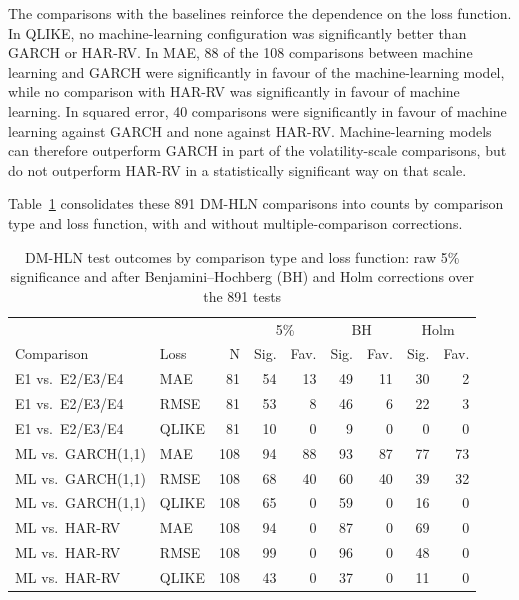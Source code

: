 \documentclass[a4paper,fleqn]{cas-sc}
\begin{document}
The comparisons with the baselines reinforce the dependence on the loss function. In QLIKE, no machine-learning configuration was significantly better than GARCH or HAR-RV. In MAE, 88 of the 108 comparisons between machine learning and GARCH were significantly in favour of the machine-learning model, while no comparison with HAR-RV was significantly in favour of machine learning. In squared error, 40 comparisons were significantly in favour of machine learning against GARCH and none against HAR-RV. Machine-learning models can therefore outperform GARCH in part of the volatility-scale comparisons, but do not outperform HAR-RV in a statistically significant way on that scale.

Table~\ref{tab:dm_tests} consolidates these 891 DM-HLN comparisons into counts by comparison type and loss function, with and without multiple-comparison corrections.

\begin{table}[t]
\centering
\caption{DM-HLN test outcomes by comparison type and loss function: raw 5\% significance and after Benjamini--Hochberg (BH) and Holm corrections over the 891 tests}
\label{tab:dm_tests}
\scriptsize
\setlength{\tabcolsep}{2pt}
\begin{tabular}{@{}p{2.2cm}p{0.8cm}rrrrrrr@{}}
\hline
 & & & \multicolumn{2}{c}{5\%} & \multicolumn{2}{c}{BH} & \multicolumn{2}{c}{Holm} \\
Comparison & Loss & N & Sig. & Fav. & Sig. & Fav. & Sig. & Fav. \\
\hline
E1 vs.\ E2/E3/E4 & MAE & 81 & 54 & 13 & 49 & 11 & 30 & 2 \\
E1 vs.\ E2/E3/E4 & RMSE & 81 & 53 & 8 & 46 & 6 & 22 & 3 \\
E1 vs.\ E2/E3/E4 & QLIKE & 81 & 10 & 0 & 9 & 0 & 0 & 0 \\
ML vs.\ GARCH(1,1) & MAE & 108 & 94 & 88 & 93 & 87 & 77 & 73 \\
ML vs.\ GARCH(1,1) & RMSE & 108 & 68 & 40 & 60 & 40 & 39 & 32 \\
ML vs.\ GARCH(1,1) & QLIKE & 108 & 65 & 0 & 59 & 0 & 16 & 0 \\
ML vs.\ HAR-RV & MAE & 108 & 94 & 0 & 87 & 0 & 69 & 0 \\
ML vs.\ HAR-RV & RMSE & 108 & 99 & 0 & 96 & 0 & 48 & 0 \\
ML vs.\ HAR-RV & QLIKE & 108 & 43 & 0 & 37 & 0 & 11 & 0 \\
\hline
\end{tabular}
\end{table}
\end{document}
